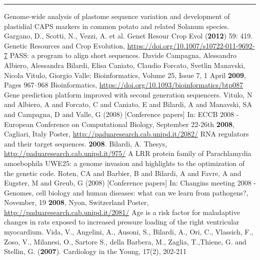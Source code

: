 \documentclass[9pt]{stackoverflow-upgraded-version} %
\begin{document}
\textcolor{stackoverflow}{\hrule}
\vspace{\baselineskip} %
\begin{publicationlist}
	\publication
		{Genome-wide analysis of plastome sequence variation and development of plastidial CAPS markers in common potato and related Solanum species.}
		{Gargano, D., Scotti, N., Vezzi, A. et al. Genet Resour Crop Evol (\textbf{2012}) 59: 419.}
		{Genetic Resources and Crop Evolution, \href{https://doi.org/10.1007/s10722-011-9692-7}{https://doi.org/10.1007/s10722-011-9692-7}}
	\publication
		{PASS: a program to align short sequences.}
		{Davide Campagna, Alessandro Albiero, Alessandra Bilardi, Elisa Caniato, Claudio Forcato, Svetlin Manavski, Nicola Vitulo, Giorgio Valle; Bioinformatics, Volume 25, Issue 7, 1 April \textbf{2009}, Pages 967–968}
		{Bioinformatics, \href{https://doi.org/10.1093/bioinformatics/btp087}{https://doi.org/10.1093/bioinformatics/btp087}}
	\publication
		{Gene prediction platform improved with second generation sequencers.}
		{Vitulo, N and Albiero, A and Forcato, C and Caniato, E and Bilardi, A and Manavski, SA and Campagna, D and Valle, G (2008) [Conference papers] In: ECCB 2008 - European Conference on Computational Biology, September 22-26th \textbf{2008}, Cagliari, Italy}
		{Poster, \href{http://paduaresearch.cab.unipd.it/2082/}{http://paduaresearch.cab.unipd.it/2082/}}
	\publication
		{RNA regulators and their target sequences. \textbf{2008}.}
		{Bilardi, A.}
		{Thesys, \href{http://paduaresearch.cab.unipd.it/975/}{http://paduaresearch.cab.unipd.it/975/}}
	\publication
		{A LRR protein family of Parachlamydia amoebophila UWE25: a genome invasion and highlights to the optimization of the genetic code.}
		{Roten, CA and Barbier, B and Bilardi, A and Favre, A and Eugster, M and Greub, G (2008) [Conference papers] In: Changins meeting 2008 - Genomes, cell biology and human diseases: what can we learn from pathogens?, November, 19 \textbf{2008}, Nyon, Switzerland}
		{Poster, \href{http://paduaresearch.cab.unipd.it/2081/}{http://paduaresearch.cab.unipd.it/2081/}}
	\publication
		{Age is a risk factor for maladaptive changes in rats exposed to increased pressure loading of the right ventricular myocardium.}
		{Vida, V., Angelini, A., Ausoni, S., Bilardi, A., Ori, C., Vlassich, F., Zoso, V., Milanesi, O., Sartore S., della Barbera, M., Zaglia, T.,Thiene, G. and Stellin, G. (\textbf{2007}). Cardiology in the Young, 17(2), 202-211}

\end{publicationlist}
\end{document}
